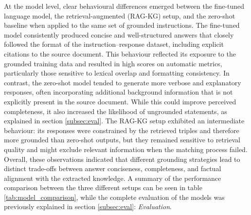 At the model level, clear behavioural differences emerged between the fine-tuned language model, the retrieval-augmented (RAG-KG) setup, and the zero-shot baseline when applied to the same set of grounded instructions. The fine-tuned model consistently produced concise and well-structured answers that closely followed the format of the instruction–response dataset, including explicit citations to the source document. This behaviour reflected its exposure to the grounded training data and resulted in high scores on automatic metrics, particularly those sensitive to lexical overlap and formatting consistency. In contrast, the zero-shot model tended to generate more verbose and explanatory responses, often incorporating additional background information that is not explicitly present in the source document. While this could improve perceived completeness, it also increased the likelihood of ungrounded statements, as explained in section \ref{subsec:eval}. The RAG-KG setup exhibited an intermediate behaviour: its responses were constrained by the retrieved triples and therefore more grounded than zero-shot outputs, but they remained sensitive to retrieval quality and might exclude relevant information when the matching process failed. Overall, these observations indicated that different grounding strategies lead to distinct trade-offs between answer conciseness, completeness, and factual alignment with the extracted knowledge. A summary of the performance comparison between the three different setups can be seen in table \ref{tab:model_comparison}, while the complete evaluation of the models was previously explained in section \ref{subsec:eval}: \textit{Evaluation}.


\begin{table}[t]
\centering
\caption{Performance comparison across different model setups}
\label{tab:model_comparison}
\end{table}








